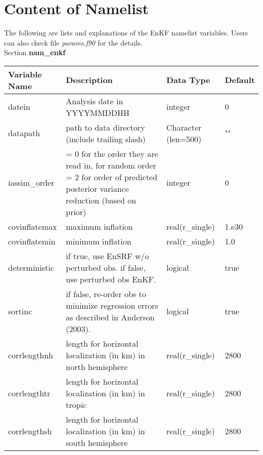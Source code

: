 \chapter{Content of Namelist}\label{nameless}

The following are lists and explanations of the EnKF namelist variables. Users can also check file \textit{params.f90} for the details. \\

Section \textbf{nam\_enkf}
\begin{table}[htbp]
\centering
\begin{tabular}{p{3cm}p{7cm}p{2.5cm}p{1.5cm}}
\hline
Variable Name&Description&Data Type&Default\\
\hline
datein&Analysis date in YYYYMMDDHH&integer&0\\
datapath&path to data directory (include trailing slash)&Character (len=500) &""\\
iassim\_order&= 0 for the order they are read in,\newline
=1 for random order\newline
= 2 for order of predicted posterior variance reduction (based on prior) &integer&0\\
covinflatemax&maximum inflation&real(r\_single)&1.e30\\
covinflatemin&minimum inflation&real(r\_single)&1.0\\
deterministic&if true, use EnSRF w/o perturbed obs.\newline
                     if false, use perturbed obs EnKF. & logical & true\\
sortinc&if false, re-order obs to minimize regression 
                     errors as described in Anderson (2003). &logical &true\\
corrlengthnh&length for horizontal localization (in km) in north hemisphere&real(r\_single)&2800\\
corrlengthtr&length for horizontal localization (in km) in tropic&real(r\_single)&2800\\
corrlengthsh&length for horizontal localization (in km) in south hemisphere&real(r\_single)&2800\\
\hline
\end{tabular}
\end{table} 


